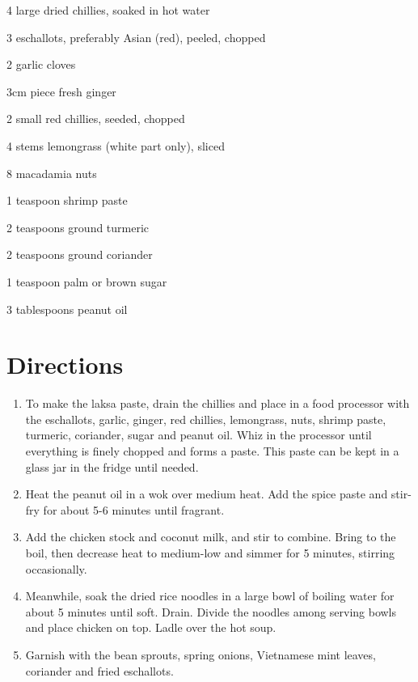 \begin{ingredients-list}
	\item 4 large dried chillies, soaked in hot water
	\item 3 eschallots, preferably Asian (red), peeled, chopped
	\item 2 garlic cloves
	\item 3cm piece fresh ginger
	\item 2 small red chillies, seeded, chopped
	\item 4 stems lemongrass (white part only), sliced
	\item 8 macadamia nuts
	\item 1 teaspoon shrimp paste
	\item 2 teaspoons ground turmeric
	\item 2 teaspoons ground coriander
	\item 1 teaspoon palm or brown sugar
	\item 3 tablespoons peanut oil
\end{ingredients-list}

\section*{Directions}
\begin{enumerate}
	\item  To make the laksa paste, drain the chillies and place in a food processor with the eschallots, garlic, ginger, red chillies, lemongrass, nuts, shrimp paste, turmeric, coriander, sugar and 			peanut oil.  Whiz in the processor until everything is finely chopped and forms a paste. This paste can be kept in a glass jar in the fridge until needed.
	\item Heat the peanut oil in a wok over medium heat. Add the spice paste and stir-fry for about 5-6 minutes until fragrant.
	\item Add the chicken stock and coconut milk, and stir to combine. Bring to the boil, then decrease heat to medium-low and simmer for 5 minutes, stirring occasionally.
	\item Meanwhile, soak the dried rice noodles in a large bowl of boiling water for about 5 minutes until soft. Drain. Divide the noodles among serving bowls and place chicken on top.
		Ladle over the hot soup.
	\item Garnish with the bean sprouts, spring onions, Vietnamese mint leaves, coriander and fried eschallots.
\end{enumerate}
 


